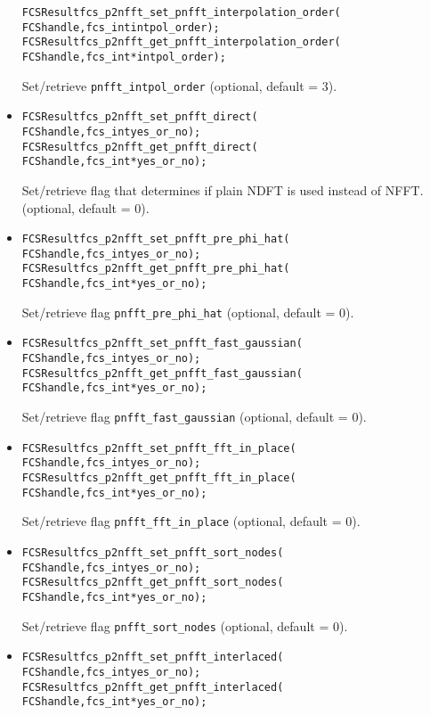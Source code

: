 \begin{itemize}
\begin{alltt}
FCSResult fcs_p2nfft_set_pnfft_interpolation_order(
    FCS handle, fcs_int intpol_order);
FCSResult fcs_p2nfft_get_pnfft_interpolation_order(
    FCS handle, fcs_int* intpol_order);
\end{alltt}
    Set/retrieve \verb!pnfft_intpol_order! (optional, default = 3).
  \item
\begin{alltt}
FCSResult fcs_p2nfft_set_pnfft_direct(
    FCS handle, fcs_int yes_or_no);
FCSResult fcs_p2nfft_get_pnfft_direct(
    FCS handle, fcs_int* yes_or_no);
\end{alltt}
    Set/retrieve flag that determines if plain NDFT is used instead of NFFT.
    (optional, default = 0).
  \item
\begin{alltt}
FCSResult fcs_p2nfft_set_pnfft_pre_phi_hat(
    FCS handle, fcs_int yes_or_no);
FCSResult fcs_p2nfft_get_pnfft_pre_phi_hat(
    FCS handle, fcs_int* yes_or_no);
\end{alltt}
    Set/retrieve flag \verb!pnfft_pre_phi_hat! (optional, default = 0).
  \item
\begin{alltt}
FCSResult fcs_p2nfft_set_pnfft_fast_gaussian(
    FCS handle, fcs_int yes_or_no);
FCSResult fcs_p2nfft_get_pnfft_fast_gaussian(
    FCS handle, fcs_int* yes_or_no);
\end{alltt}
    Set/retrieve flag \verb!pnfft_fast_gaussian! (optional, default = 0).
  \item
\begin{alltt}
FCSResult fcs_p2nfft_set_pnfft_fft_in_place(
    FCS handle, fcs_int yes_or_no);
FCSResult fcs_p2nfft_get_pnfft_fft_in_place(
    FCS handle, fcs_int* yes_or_no);
\end{alltt}
    Set/retrieve flag \verb!pnfft_fft_in_place! (optional, default = 0).
  \item
\begin{alltt}
FCSResult fcs_p2nfft_set_pnfft_sort_nodes(
    FCS handle, fcs_int yes_or_no);
FCSResult fcs_p2nfft_get_pnfft_sort_nodes(
    FCS handle, fcs_int* yes_or_no);
\end{alltt}
    Set/retrieve flag \verb!pnfft_sort_nodes! (optional, default = 0).
  \item
\begin{alltt}
FCSResult fcs_p2nfft_set_pnfft_interlaced(
    FCS handle, fcs_int yes_or_no);
FCSResult fcs_p2nfft_get_pnfft_interlaced(
    FCS handle, fcs_int* yes_or_no);
\end{alltt}

\end{itemize}
